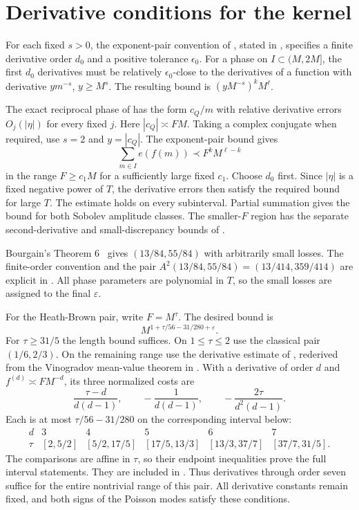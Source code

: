 \section{Derivative conditions for the kernel}
\label{app:finitepairs}

For each fixed $s>0$, the exponent-pair convention of
\cite[Section 1.1]{TY}, stated in
\cite[Definition~\ref*{six-def:pair}]{Weighted}, specifies a finite
derivative order $d_0$ and a positive tolerance $\epsilon_0$. For a phase
on $I\subset(M,2M]$, the first $d_0$ derivatives must be
relatively $\epsilon_0$-close to
the derivatives of a function with derivative $ym^{-s}$, $y\ge M^s$.
The resulting bound is $(yM^{-s})^kM^\ell$.

The exact reciprocal phase of
\cite[Proposition~\ref*{six-prop:kernel}]{Weighted} has the form $c_Q/m$ with
relative derivative errors $O_j(|\eta|)$ for every fixed $j$.
Here $|c_Q|\asymp FM$. Taking a complex conjugate when required,
use $s=2$ and $y=|c_Q|$. The exponent-pair bound gives
\[
 \sum_{m\in I}e(f(m))\prec F^kM^{\ell-k}
\]
in the range $F\ge c_1M$ for a sufficiently large fixed $c_1$.
Choose $d_0$ first. Since $|\eta|$ is a fixed negative power of $T$,
the derivative errors then satisfy the required bound for large $T$.
The estimate holds on every subinterval. Partial summation gives the
bound for both Sobolev amplitude classes.
The smaller-$F$ region has the separate second-derivative and
small-discrepancy bounds of
\cite[Proposition~\ref*{six-prop:kernel} and
Lemma~\ref*{six-lem:smallF}]{Weighted}.

Bourgain's Theorem 6~\cite{Bou17} gives $(13/84,55/84)$ with
arbitrarily small losses. The finite-order convention and the pair
$A^2(13/84,55/84)=(13/414,359/414)$ are explicit in
\cite[Theorem 1.3]{TY}. All phase parameters are polynomial in
$T$, so the small losses are assigned to the final $\varepsilon$.

For the Heath-Brown pair, write $F=M^\tau$. The desired bound is
\[
 M^{1+\tau/56-31/280+\varepsilon}.
\]
For $\tau\ge31/5$ the length bound suffices. On $1\le\tau\le2$ use
the classical pair $(1/6,2/3)$. On the remaining range use the derivative
estimate of \cite[Theorem 1]{HB17}, rederived from the Vinogradov
mean-value theorem in
\cite[Proposition~\ref*{six-prop:hbderivativeproof}]{Weighted}. With a derivative of order $d$ and
$f^{(d)}\asymp FM^{-d}$, its three normalized costs are
\[
 \frac{\tau-d}{d(d-1)},\qquad
 -\frac1{d(d-1)},\qquad
 -\frac{2\tau}{d^2(d-1)}.
\]
Each is at most $\tau/56-31/280$ on the corresponding interval below:
\[
\begin{array}{c|ccccc}
d&3&4&5&6&7\\\hline
\tau&[2,5/2]&[5/2,17/5]&[17/5,13/3]&[13/3,37/7]&[37/7,31/5].
\end{array}
\]
The comparisons are affine in $\tau$, so their endpoint inequalities
prove the full interval statements. They are included in
.
Thus derivatives through order seven suffice for the entire nontrivial
range of this pair. All derivative constants remain fixed, and both
signs of the Poisson modes satisfy these conditions.

